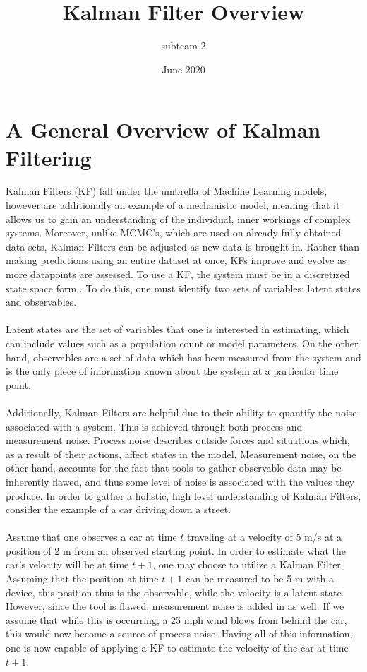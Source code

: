 \documentclass{article}
\title{Kalman Filter Overview}
\author{subteam 2}
\date{June 2020}
\begin{document}
\maketitle

\section{A General Overview of Kalman Filtering}
Kalman Filters (KF) fall under the umbrella of Machine Learning models, however are additionally an example of a mechanistic model, meaning that it allows us to gain an understanding of the individual, inner workings of complex systems. Moreover, unlike MCMC's, which are used on already fully obtained data sets, Kalman Filters can be adjusted as new data is brought in. Rather than making predictions using an entire dataset at once, KFs improve and evolve as more datapoints are assessed. To use a KF, the system must be in a discretized state space form \cite{SimonHaykinText}. To do this, one must identify two sets of variables: latent states and observables.\\
\\
Latent states are the set of variables that one is interested in estimating, which can include values such as a population count or model parameters. On the other hand, observables are a set of data which has been measured from the system and is the only piece of information known about the system at a particular time point. \\
\\
Additionally, Kalman Filters are helpful due to their ability to quantify the noise associated with a system. This is achieved through both process and measurement noise. Process noise describes outside forces and situations which, as a result of their actions, affect states in the model. Measurement noise, on the other hand, accounts for the fact that tools to gather observable data may be inherently flawed, and thus some level of noise is associated with the values they produce. In order to gather a holistic, high level understanding of Kalman Filters, consider the example of a car driving down a street.\\
\\
Assume that one observes a car at time $t$ traveling at a velocity of 5 m/s at a position of 2 m from an observed starting point. In order to estimate what the car's velocity will be at time $t+1$, one may choose to utilize a Kalman Filter. Assuming that the position at time $t+1$ can be measured to be 5 m with a device, this position thus is the observable, while the velocity is a latent state. However, since the tool is flawed, measurement noise is added in as well. If we assume that while this is occurring, a 25 mph wind blows from behind the car, this would now become a source of process noise. Having all of this information, one is now capable of applying a KF to estimate the velocity of the car at time $t+1$.\\
\end{document}

